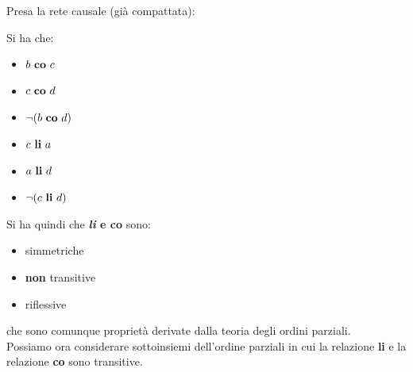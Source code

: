 \documentclass[a4paper,12pt, oneside]{book}
\begin{document}
\begin{esempio}
  Presa la rete causale (già compattata):
  \begin{figure}[H]
    \centering
  \end{figure}
  Si ha che:
  \begin{itemize}
    \item $b \mbox{ \textbf{co} }c$
    \item $c \mbox{ \textbf{co} }d$
    \item $\neg (b \mbox{ \textbf{co} }d)$
    \item $c \mbox{ \textbf{li} }a$
    \item $a \mbox{ \textbf{li} }d$
    \item $\neg (c \mbox{ \textbf{li} }d)$
  \end{itemize}
\end{esempio}
Si ha quindi che \textbf{\textit{li} \textnormal{e} co} sono:
\begin{itemize}
  \item simmetriche
  \item \textbf{non} transitive
  \item riflessive
\end{itemize}
che sono comunque proprietà derivate dalla teoria degli ordini parziali.\\
Possiamo ora considerare sottoinsiemi dell'ordine parziali in cui la relazione
\textbf{li} e la relazione \textbf{co} sono transitive.
\end{document}

